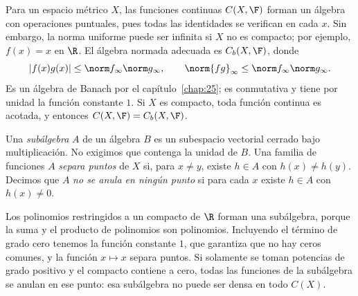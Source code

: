 \begin{ejemplo}
Para un espacio métrico $X$, las funciones continuas $C(X,\F)$ forman un álgebra con operaciones puntuales, pues todas las identidades se verifican en cada $x$. Sin embargo, la norma uniforme puede ser infinita si $X$ no es compacto; por ejemplo, $f(x)=x$ en $\R$. El álgebra normada adecuada es $C_b(X,\F)$, donde
\[
 |f(x)g(x)|\le\norm f_\infty\norm g_\infty,
 \qquad\norm{fg}_\infty\le\norm f_\infty\norm g_\infty.
\]
Es un álgebra de Banach por el capítulo~\ref{chap:25}; es conmutativa y tiene por unidad la función constante $1$. Si $X$ es compacto, toda función continua es acotada, y entonces $C(X,\F)=C_b(X,\F)$.
\end{ejemplo}

\begin{definicion}
Una \emph{subálgebra} $A$ de un álgebra $B$ es un subespacio vectorial cerrado bajo multiplicación. No exigimos que contenga la unidad de $B$. Una familia de funciones $A$ \emph{separa puntos} de $X$ si, para $x\ne y$, existe $h\in A$ con $h(x)\ne h(y)$. Decimos que $A$ \emph{no se anula en ningún punto} si para cada $x$ existe $h\in A$ con $h(x)\ne0$.
\end{definicion}

Los polinomios restringidos a un compacto de $\R$ forman una subálgebra, porque la suma y el producto de polinomios son polinomios. Incluyendo el término de grado cero tenemos la función constante $1$, que garantiza que no hay ceros comunes, y la función $x\mapsto x$ separa puntos. Si solamente se toman potencias de grado positivo y el compacto contiene a cero, todas las funciones de la subálgebra se anulan en ese punto: esa subálgebra no puede ser densa en todo $C(X)$.

